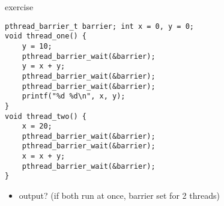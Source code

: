 \begin{frame}[fragile]{exercise}
\lstset{language=C,style=smaller}
\begin{lstlisting}
pthread_barrier_t barrier; int x = 0, y = 0;
void thread_one() {
    y = 10;
    pthread_barrier_wait(&barrier);
    y = x + y;
    pthread_barrier_wait(&barrier);
    pthread_barrier_wait(&barrier);
    printf("%d %d\n", x, y);
}
void thread_two() {
    x = 20;
    pthread_barrier_wait(&barrier);
    pthread_barrier_wait(&barrier);
    x = x + y;
    pthread_barrier_wait(&barrier);
}
\end{lstlisting}
\begin{itemize}
\item output?  (if both run at once, barrier set for 2 threads)
\end{itemize}
\end{frame}
